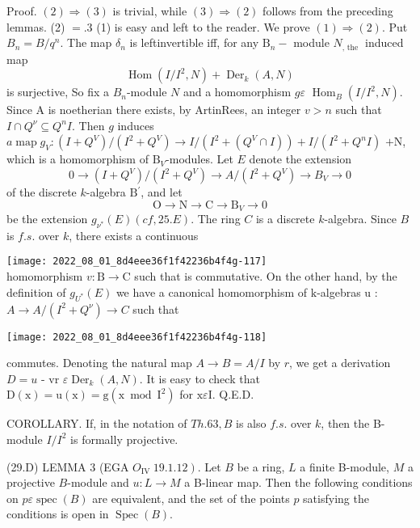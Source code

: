 Proof. $(2) \Rightarrow(3)$ is trivial, while $(3) \Rightarrow(2)$ follows from the preceding lemmas. (2) $=.3$ (1) is easy and left to the reader. We prove $(1) \Rightarrow(2)$. Put $B_{n}=B / q^{n}$. The map $\delta_{n}$ is leftinvertible iff, for any $\mathrm{B}_{n}-$ module $N_{\text {, the }}$ induced map
$$
\operatorname{Hom}\left(I / I^{2}, N\right)+\operatorname{Der}_{k}(A, N)
$$
is surjective, So fix a $B_{n}$-module $N$ and a homomorphism $g \varepsilon$ $\operatorname{Hom}_{B}\left(I / I^{2}, N\right)$. Since A is noetherian there exists, by ArtinRees, an integer $v>n$ such that $I \cap Q^{\nu} \subseteq Q^{n} I$. Then $g$ induces $a \operatorname{map} g_{V}:\left(I+Q^{V}\right) /\left(I^{2}+Q^{V}\right) \rightarrow I /\left(I^{2}+\left(Q^{V} \cap I\right)\right)+I /\left(I^{2}+Q^{n} I\right)$ $+\mathrm{N}$, which is a homomorphism of $\mathrm{B}_{V}$-modules. Let $E$ denote the extension
$$
0 \rightarrow\left(I+Q^{V}\right) /\left(I^{2}+Q^{V}\right) \rightarrow A /\left(I^{2}+Q^{V}\right) \rightarrow B_{V} \rightarrow 0
$$
of the discrete $k$-algebra $\mathrm{B}{ }^{\prime}$, and let
$$
\mathrm{O} \rightarrow \mathrm{N} \rightarrow \mathrm{C} \rightarrow \mathrm{B}_{V} \rightarrow 0
$$
be the extension $g_{\nu^{*}}(E)(c f, 25 . E)$. The ring $C$ is a discrete $k$-algebra. Since $B$ is $f . s$. over $k$, there exists a continuous

\texttt{[image: 2022\_08\_01\_8d4eee36f1f42236b4f4g-117]}\\
homomorphism $v: \mathrm{B} \rightarrow \mathrm{C}$ such that is commutative. On the other hand, by the definition of $g_{U^{*}}(E)$ we have a canonical homomorphism of $\mathrm{k}$-algebras $\mathrm{u}$ : $A \rightarrow A /\left(I^{2}+Q^{\nu}\right) \rightarrow C$ such that

\texttt{[image: 2022\_08\_01\_8d4eee36f1f42236b4f4g-118]}

commutes. Denoting the natural map $A \rightarrow B=A / I$ by $r$, we get a derivation $D=u$ - vr $\varepsilon \operatorname{Der}_{k}(A, N)$. It is easy to check that $\mathrm{D}(\mathrm{x})=\mathrm{u}(\mathrm{x})=\mathrm{g}\left(\mathrm{x} \bmod \mathrm{I}^{2}\right)$ for $\mathrm{x} \varepsilon \mathrm{I}$. Q.E.D.

COROLLARY. If, in the notation of $T h .63, B$ is also $f . s$. over $k$, then the B-module $I / I^{2}$ is formally projective.

(29.D) LEMMA 3 (EGA $\left.O_{\text {IV }} 19.1 .12\right)$. Let $B$ be a ring, $L$ a finite B-module, $M$ a projective $B$-module and $u: L \rightarrow M$ a B-linear map. Then the following conditions on $p \varepsilon \operatorname{spec}(B)$ are equivalent, and the set of the points $p$ satisfying the conditions is open in $\operatorname{Spec}(B)$.


